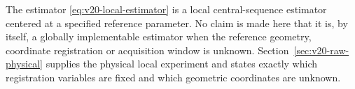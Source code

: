 \begin{remark}
The estimator \eqref{eq:v20-local-estimator} is a local central-sequence
estimator centered at a specified reference parameter.  No claim is made
here that it is, by itself, a globally implementable estimator when the
reference geometry, coordinate registration or acquisition window is
unknown.  Section~\ref{sec:v20-raw-physical} supplies the physical local
experiment and states exactly which registration variables are fixed and
which geometric coordinates are unknown.
\end{remark}
